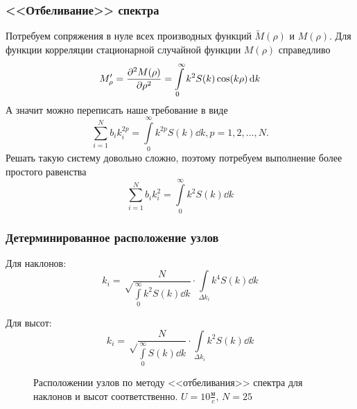 \documentclass[10pt,pdf,hyperref={unicode}, dvipsnames]{beamer}
\newcommand{\tM}{\widetilde{M}}
\begin{document}
\begin{frame}[t]
    \frametitle{<<Отбеливание>> спектра}
    Потребуем сопряжения в нуле всех производных  функций
    $\tM(\rho)$ и $M(\rho)$. 
    Для функции корреляции стационарной случайной функции $M(\rho)$ справедливо
    \begin{equation}
    	M'_{\rho}=\pdv[2]{M(\rho)}{\rho}=\int\limits_{0}^{\infty} k^2 S(k)\cos(k \rho)\dd{k}
    \end{equation}
    А значит можно переписать наше требование в виде
 \begin{equation}
	\sum_{i=1}^N b_ik_i^{2p}=\int\limits_{0}^{\infty} k^{2p}S(k)\dd{k}, p = 1,2,\dots,N.
\end{equation}
Решать такую систему довольно сложно, поэтому потребуем выполнение более простого равенства
\begin{equation}
	\sum_{i=1}^N b_ik_i^{2}=\int\limits_{0}^{\infty} k^{2}S(k)\dd{k}
\end{equation}


\end{frame}


\begin{frame}[t]\frametitle{Детерминированное расположение узлов}
    

\begin{minipage}{0.49\linewidth}
\centering Для наклонов:
\begin{equation*}
	k_i=\sqrt\frac{N}{{\int\limits_{0}^{\infty} k^2 S(k) \dd{k}}}\cdot {\int\limits_{\Delta k_i} k^4 S(k) \dd{k}}
	\label{eq:ki}
\end{equation*}
\end{minipage}
\hfill
\begin{minipage}{0.49\linewidth}
\centering Для высот:
	\begin{equation*}
	k_i=\sqrt\frac{N}{{\int\limits_{0}^{\infty} S(k) \dd{k}}}\cdot \int\limits_{\Delta k_i} k^2 S(k) \dd{k}
	\label{eq:ki}
\end{equation*}
\end{minipage}
\vfill
\begin{figure}[H]
	\begin{minipage}{0.49\linewidth}
			\centering
	\end{minipage}
	\hfill
	\begin{minipage}{0.49\linewidth}
			\centering
	\end{minipage}
	\caption{Расположении узлов по методу <<отбеливания>> спектра  для наклонов и высот соответственно. $U=10 \frac{\text{м}}{c}$, $N=25$}
	\label{fig:splits}		
\end{figure}

\end{frame}
\end{document}
